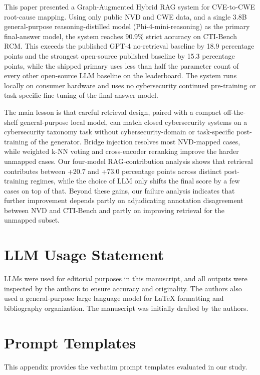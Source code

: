 This paper presented a Graph-Augmented Hybrid RAG system for CVE-to-CWE root-cause mapping. Using only public NVD and CWE data, and a single 3.8B general-purpose reasoning-distilled model (Phi-4-mini-reasoning) as the primary final-answer model, the system reaches 90.9\% strict accuracy on CTI-Bench RCM. This exceeds the published GPT-4 no-retrieval baseline by 18.9 percentage points and the strongest open-source published baseline by 15.3 percentage points, while the shipped primary uses less than half the parameter count of every other open-source LLM baseline on the leaderboard. The system runs locally on consumer hardware and uses no cybersecurity continued pre-training or task-specific fine-tuning of the final-answer model.

The main lesson is that careful retrieval design, paired with a compact off-the-shelf general-purpose local model, can match closed cybersecurity systems on a cybersecurity taxonomy task without cybersecurity-domain or task-specific post-training of the generator. Bridge injection resolves most NVD-mapped cases, while weighted k-NN voting and cross-encoder reranking improve the harder unmapped cases. Our four-model RAG-contribution analysis shows that retrieval contributes between +20.7 and +73.0 percentage points across distinct post-training regimes, while the choice of LLM only shifts the final score by a few cases on top of that. Beyond these gains, our failure analysis indicates that further improvement depends partly on adjudicating annotation disagreement between NVD and CTI-Bench and partly on improving retrieval for the unmapped subset.

\section*{LLM Usage Statement}

LLMs were used for editorial purposes in this manuscript, and all outputs were inspected by the authors to ensure accuracy and originality. The authors also used a general-purpose large language model for LaTeX formatting and bibliography organization. The manuscript was initially drafted by the authors.

\appendices

\section{Prompt Templates}
\label{app:prompts}

This appendix provides the verbatim prompt templates evaluated in our study.

